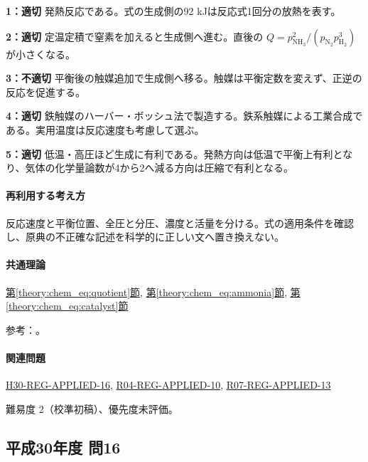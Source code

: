 \noindent\textbf{1：適切} 発熱反応である。式の生成側の92 kJは反応式1回分の放熱を表す。\par

\noindent\textbf{2：適切} 定温定積で窒素を加えると生成側へ進む。直後の \(Q=p_{\mathrm{NH_3}}^2/(p_{\mathrm{N_2}}p_{\mathrm{H_2}}^3)\) が小さくなる。\par

\noindent\textbf{3：不適切} 平衡後の触媒追加で生成側へ移る。触媒は平衡定数を変えず、正逆の反応を促進する。\par

\noindent\textbf{4：適切} 鉄触媒のハーバー・ボッシュ法で製造する。鉄系触媒による工業合成である。実用温度は反応速度も考慮して選ぶ。\par

\noindent\textbf{5：適切} 低温・高圧ほど生成に有利である。発熱方向は低温で平衡上有利となり、気体の化学量論数が4から2へ減る方向は圧縮で有利となる。\par

\paragraph{再利用する考え方} 反応速度と平衡位置、全圧と分圧、濃度と活量を分ける。式の適用条件を確認し、原典の不正確な記述を科学的に正しい文へ置き換えない。

\paragraph{共通理論} \hyperref[theory:chem_eq:quotient]{第\ref*{theory:chem_eq:quotient}節}, \hyperref[theory:chem_eq:ammonia]{第\ref*{theory:chem_eq:ammonia}節}, \hyperref[theory:chem_eq:catalyst]{第\ref*{theory:chem_eq:catalyst}節}

\par 参考：\cite{iupac_greenbook2012}。

\paragraph{関連問題} \hyperref[q:h30-reg-applied-16]{H30-REG-APPLIED-16}, \hyperref[q:r04-reg-applied-10]{R04-REG-APPLIED-10}, \hyperref[q:r07-reg-applied-13]{R07-REG-APPLIED-13}

\par 難易度 2（校準初稿）、優先度未評価。

\subsection{平成30年度 問16}
\label{q:h30-reg-applied-16}

